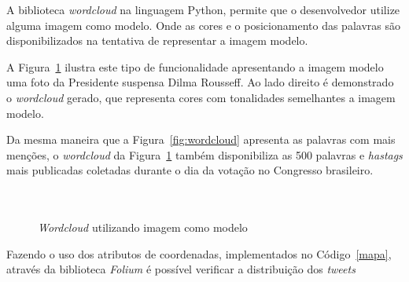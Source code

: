 A biblioteca \textit{wordcloud} na linguagem Python, permite que o desenvolvedor utilize alguma imagem como modelo. Onde as cores e o posicionamento das palavras são disponibilizados na tentativa de representar a imagem modelo.

A Figura~\ref{fig:worddilma} ilustra este tipo de funcionalidade apresentando a imagem modelo uma foto da Presidente suspensa Dilma Rousseff. Ao lado direito é demonstrado o \textit{wordcloud} gerado, que representa cores com tonalidades semelhantes a imagem modelo.

Da mesma maneira que a Figura~\ref{fig:wordcloud} apresenta as palavras com mais menções, o \textit{wordcloud} da Figura~\ref{fig:worddilma} também disponibiliza as 500 palavras e \textit{hastags} mais publicadas coletadas durante o dia da votação no Congresso brasileiro. \\ \\ \\

\begin{figure}[h]
	\centering
	\caption{\textit{Wordcloud} utilizando imagem como modelo}
	\vspace{-0.3cm}
	\label{fig:worddilma}
\end{figure}

Fazendo o uso dos atributos de coordenadas, implementados no Código~\ref{mapa}, através da biblioteca \textit{Folium} é possível verificar a distribuição dos \textit{tweets}


